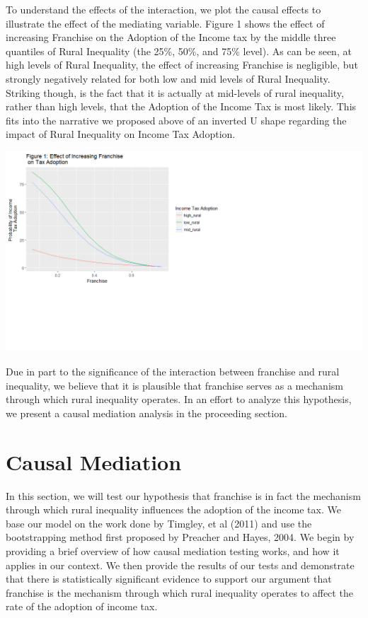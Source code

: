 \documentclass[letter, 12pt]{article}
\begin{document}
To understand the effects of the interaction, we plot the causal effects to illustrate the effect of the mediating variable. Figure 1 shows the effect of increasing Franchise on the Adoption of the Income tax by the middle three quantiles of Rural Inequality (the 25\%, 50\%, and 75\% level). As can be seen, at high levels of Rural Inequality, the effect of increasing Franchise is negligible, but strongly negatively related for both low and mid levels of Rural Inequality. Striking though, is the fact that it is actually at mid-levels of rural inequality, rather than high levels, that the Adoption of the Income Tax is most likely. This fits into the narrative we proposed above of an inverted U shape regarding the impact of Rural Inequality on Income Tax Adoption.

\includegraphics[scale = 1]{ps745-figure1}

Due in part to the significance of the interaction between franchise and rural inequality, we believe that it is plausible that franchise serves as a mechanism through which rural inequality operates. In an effort to analyze this hypothesis, we present a causal mediation analysis in the proceeding section. 

\section{Causal Mediation}

In this section, we will test our hypothesis that franchise is in fact the mechanism through which rural inequality influences the adoption of the income tax. We base our model on the work done by Timgley, et al (2011) and use the bootstrapping method first proposed by Preacher and Hayes, 2004. We begin by providing a brief overview of how causal mediation testing works, and how it applies in our context. We then provide the results of our tests and demonstrate that there is statistically significant evidence to support our argument that franchise is the mechanism through which rural inequality operates to affect the rate of the adoption of income tax.
\end{document}
